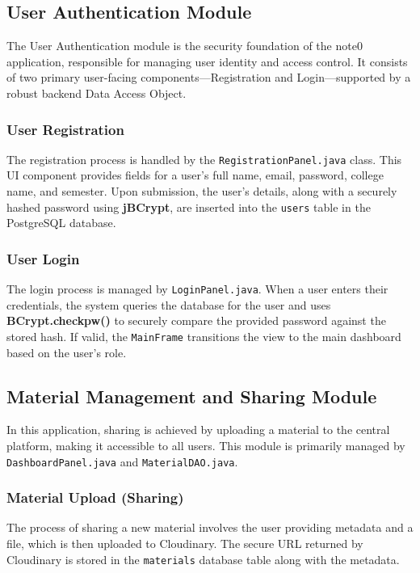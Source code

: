 \documentclass[12pt, a4paper]{report}
\begin{document}
\subsection{User Authentication Module}
The User Authentication module is the security foundation of the note0 application, responsible for managing user identity and access control. It consists of two primary user-facing components—Registration and Login—supported by a robust backend Data Access Object.

\subsubsection{User Registration}
The registration process is handled by the \texttt{RegistrationPanel.java} class. This UI component provides fields for a user's full name, email, password, college name, and semester. Upon submission, the user's details, along with a securely hashed password using \textbf{jBCrypt}, are inserted into the \texttt{users} table in the PostgreSQL database.

\subsubsection{User Login}
The login process is managed by \texttt{LoginPanel.java}. When a user enters their credentials, the system queries the database for the user and uses \textbf{BCrypt.checkpw()} to securely compare the provided password against the stored hash. If valid, the \texttt{MainFrame} transitions the view to the main dashboard based on the user's role.

\subsection{Material Management and Sharing Module}
In this application, sharing is achieved by uploading a material to the central platform, making it accessible to all users. This module is primarily managed by \texttt{DashboardPanel.java} and \texttt{MaterialDAO.java}.

\subsubsection{Material Upload (Sharing)}
The process of sharing a new material involves the user providing metadata and a file, which is then uploaded to Cloudinary. The secure URL returned by Cloudinary is stored in the \texttt{materials} database table along with the metadata.
\end{document}
